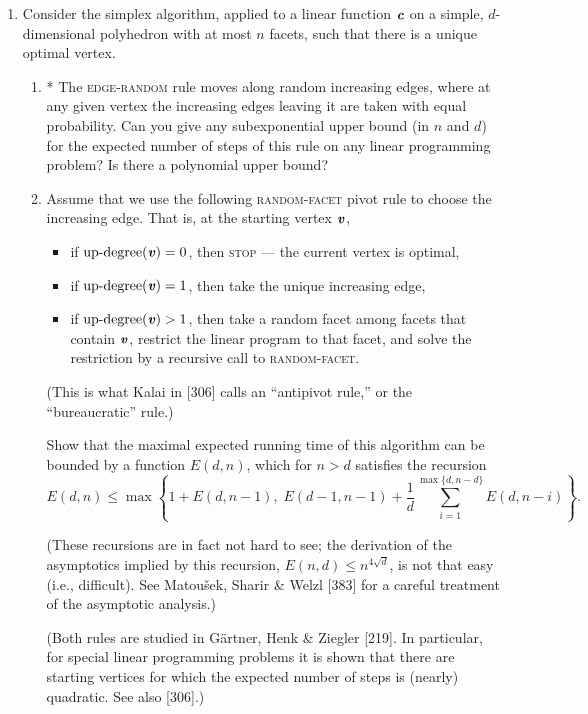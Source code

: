 \documentclass{article}
\begin{document}
\begin{enumerate}
\begin{proof}
\end{proof}

\item Consider the simplex algorithm, applied to a linear function $\textbf{\textit{c}}$ on a simple, $d$-dimensional polyhedron with at most $n$ facets, such that there is a unique optimal vertex.

\begin{enumerate}[label=(\roman*)]
\item* The \textsc{edge-random} rule moves along random increasing edges, where at any given vertex the increasing edges leaving it are taken with equal probability. Can you give any subexponential upper bound (in $n$ and $d$) for the expected number of steps of this rule on any linear programming problem? Is there a polynomial upper bound?

\item[(ii)] Assume that we use the following \textsc{random-facet} pivot rule to choose the increasing edge. That is, at the starting vertex $\textbf{\textit{v}}$,

\begin{itemize}
\item if $\text{up-degree}(\textbf{\textit{v}}) = 0$, then \textsc{stop} --- the current vertex is optimal,
\item if $\text{up-degree}(\textbf{\textit{v}}) = 1$, then take the unique increasing edge,
\item if $\text{up-degree}(\textbf{\textit{v}}) > 1$, then take a random facet among facets that contain $\textbf{\textit{v}}$, restrict the linear program to that facet, and solve the restriction by a recursive call to \textsc{random-facet}.
\end{itemize}

(This is what Kalai in [306] calls an ``antipivot rule,'' or the ``bureaucratic'' rule.)

Show that the maximal expected running time of this algorithm can be bounded by a function $E(d,n)$, which for $n>d$ satisfies the recursion
\[
E(d,n) \le \max\left\{ 1 + E(d,n-1),\; E(d-1,n-1) + \frac{1}{d} \sum_{i=1}^{\max\{d,n-d\}} E(d,n-i) \right\}.
\]

(These recursions are in fact not hard to see; the derivation of the asymptotics implied by this recursion, $E(n,d) \le n^{4\sqrt{d}}$, is not that easy (i.e., difficult). See Matou\v{s}ek, Sharir \& Welzl [383] for a careful treatment of the asymptotic analysis.)

(Both rules are studied in G\"artner, Henk \& Ziegler [219]. In particular, for special linear programming problems it is shown that there are starting vertices for which the expected number of steps is (nearly) quadratic. See also [306].)
\end{enumerate}


\end{enumerate}
\end{document}
